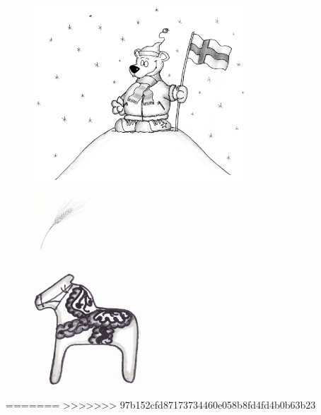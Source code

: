 %

\begin{figure}[!b]
\begin{center}
\includegraphics[width=8cm]{../bilder/i_hogan_nord.png} 
\end{center}
\end{figure}
\clearpage

\clearpage

\clearpage

\clearpage

\clearpage

\begin{figure}[!b]
\begin{center}
\includegraphics[height=25mm]{../bilder/sad.jpg} 
\end{center}
\end{figure}
\clearpage

\clearpage

\clearpage

\clearpage

\clearpage

\clearpage

\clearpage

\clearpage

\clearpage

\begin{figure}[!b]
\begin{center}
\includegraphics[width=4cm]{../bilder/dalahast.jpg} 
\end{center}
\end{figure}
\clearpage

\clearpage

=======
\clearpage
>>>>>>> 97b152cfd87173734460e058b8fd4fd4b0b63b23
